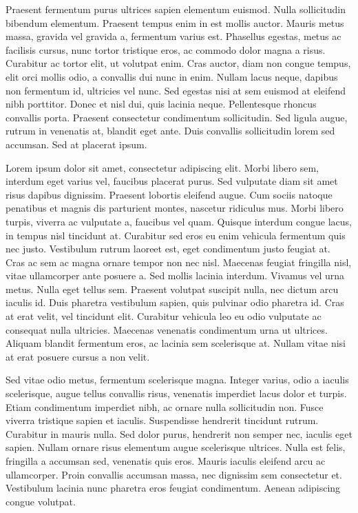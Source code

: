 \documentclass{book}
\begin{document}
Praesent fermentum purus ultrices sapien elementum euismod. Nulla sollicitudin
bibendum elementum. Praesent tempus enim in est mollis auctor. Mauris metus
massa, gravida vel gravida a, fermentum varius est. Phasellus egestas, metus ac
facilisis cursus, nunc tortor tristique eros, ac commodo dolor magna a risus.
Curabitur ac tortor elit, ut volutpat enim. Cras auctor, diam non congue tempus,
elit orci mollis odio, a convallis dui nunc in enim. Nullam lacus neque, dapibus
non fermentum id, ultricies vel nunc. Sed egestas nisi at sem euismod at
eleifend nibh porttitor. Donec et nisl dui, quis lacinia neque. Pellentesque
rhoncus convallis porta. Praesent consectetur condimentum sollicitudin. Sed
ligula augue, rutrum in venenatis at, blandit eget ante. Duis convallis
sollicitudin lorem sed accumsan. Sed at placerat ipsum.



Lorem ipsum dolor sit amet, consectetur adipiscing elit. Morbi libero sem,
interdum eget varius vel, faucibus placerat purus. Sed vulputate diam sit amet
risus dapibus dignissim. Praesent lobortis eleifend augue. Cum sociis natoque
penatibus et magnis dis parturient montes, nascetur ridiculus mus. Morbi libero
turpis, viverra ac vulputate a, faucibus vel quam. Quisque interdum congue
lacus, in tempus nisl tincidunt at. Curabitur sed eros eu enim vehicula
fermentum quis nec justo. Vestibulum rutrum laoreet est, eget condimentum justo
feugiat at. Cras ac sem ac magna ornare tempor non nec nisl. Maecenas feugiat
fringilla nisl, vitae ullamcorper ante posuere a. Sed mollis lacinia interdum.
Vivamus vel urna metus. Nulla eget tellus sem. Praesent volutpat suscipit nulla,
nec dictum arcu iaculis id. Duis pharetra vestibulum sapien, quis pulvinar odio
pharetra id. Cras at erat velit, vel tincidunt elit. Curabitur vehicula leo eu
odio vulputate ac consequat nulla ultricies. Maecenas venenatis condimentum
urna ut ultrices. Aliquam blandit fermentum eros, ac lacinia sem scelerisque
at. Nullam vitae nisi at erat posuere cursus a non velit.


Sed vitae odio metus, fermentum scelerisque magna. Integer varius, odio a
iaculis scelerisque, augue tellus convallis risus, venenatis imperdiet lacus
dolor et turpis. Etiam condimentum imperdiet nibh, ac ornare nulla sollicitudin
non. Fusce viverra tristique sapien et iaculis. Suspendisse hendrerit tincidunt
rutrum. Curabitur in mauris nulla. Sed dolor purus, hendrerit non semper nec,
iaculis eget sapien. Nullam ornare risus elementum augue scelerisque ultrices.
Nulla est felis, fringilla a accumsan sed, venenatis quis eros. Mauris iaculis
eleifend arcu ac ullamcorper. Proin convallis accumsan massa, nec dignissim sem
consectetur et. Vestibulum lacinia nunc pharetra eros feugiat condimentum.
Aenean adipiscing congue volutpat.
\end{document}
